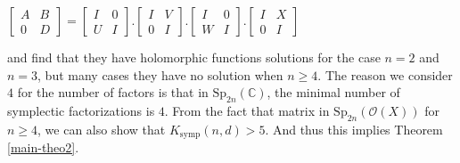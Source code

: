 \documentclass[10pt]{amsart}
\theoremstyle{remark}
\begin{document}
\begin{center}
    $\left[\begin{array}{ccc} A & B \\ 0 & D\end{array}\right]  = \left[\begin{array}{ccc} I & 0 \\ U & I\end{array}\right].\left[\begin{array}{ccc} I & V \\ 0 & I\end{array}\right].\left[\begin{array}{ccc} I & 0 \\ W & I\end{array}\right].\left[\begin{array}{ccc} I & X \\ 0 & I\end{array}\right]$
\end{center}
and find that they have holomorphic functions solutions for the case $n=2$ and $n=3$, but many cases they have no solution when $n \geq 4$. The reason we consider $4$ for the number of factors is that in $\mathrm{Sp}_{2n}(\mathbb{C})$, the minimal number of symplectic factorizations is $4$. From the fact that matrix in $\mathrm{Sp}_{2n}(\mathcal{O}(X))$ for $n \geq 4$, we can also show that $K_{\mathrm{symp}}(n,d) > 5$. And thus this implies Theorem \ref{main-theo2}.  
\fi

\iffalse
\end{document}
